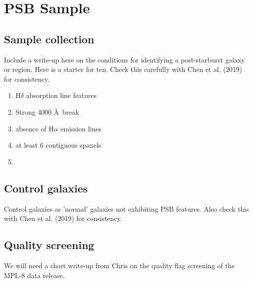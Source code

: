 \section{PSB Sample}
\label{sec:sample}

\subsection{Sample collection}
Include a write-up here on the conditions for identifying a post-starburst galaxy or region. Here is a starter for ten. Check this carefully with Chen et al. (2019) for consistency.
\begin{enumerate}
    \item H$\delta$ absorption line features
    \item Strong 4000 \AA\, break 
    \item absence of H$\alpha$ emission lines
    \item at least 6 contiguous spaxels
    \item 
\end{enumerate}

\subsection{Control galaxies}
Control galaxies as 'normal' galaxies not exhibiting PSB features. Also check this with Chen et al. (2019) for consistency.

\subsection{Quality screening}
We will need a short write-up from Chris on the quality flag screening of the MPL-8 data release.

